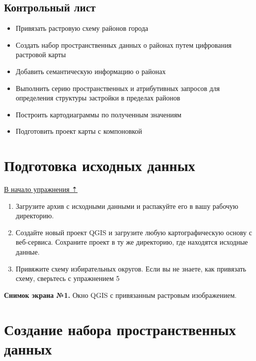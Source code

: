 \documentclass[
  12pt,
]{book}
\providecommand{\tightlist}{%
  \setlength{\itemsep}{0pt}\setlength{\parskip}{0pt}}
\begin{document}
\hypertarget{digitizing-control}{%
\subsection{Контрольный лист}\label{digitizing-control}}

\begin{itemize}
\tightlist
\item
  Привязать растровую схему районов города
\item
  Создать набор пространственных данных о районах путем цифрования растровой карты
\item
  Добавить семантическую информацию о районах
\item
  Выполнить серию пространственных и атрибутивных запросов для определения структуры застройки в пределах районов
\item
  Построить картодиаграммы по полученным значениям
\item
  Подготовить проект карты с компоновкой
\end{itemize}

\hypertarget{digitizing-basedata}{%
\section{Подготовка исходных данных}\label{digitizing-basedata}}

\protect\hyperlink{digitizingf-districts}{В начало упражнения ⇡}

\begin{enumerate}
\def\labelenumi{\arabic{enumi}.}
\item
  Загрузите архив с исходными данными и распакуйте его в вашу рабочую директорию.
\item
  Создайте новый проект QGIS и загрузите любую картографическую основу с веб-сервиса. Сохраните проект в ту же директорию, где находятся исходные данные.
\item
  Привяжите схему избирательных округов. Если вы не знаете, как привязать схему, сверьтесь с \protect\hypertarget{raster-reference}{}{упражнением 5}
\end{enumerate}

\textbf{Снимок экрана №1.} Окно QGIS с привязанным растровым изображением.

\hypertarget{digitizing-new-geopackage}{%
\section{Создание набора пространственных данных}\label{digitizing-new-geopackage}}
\end{document}
